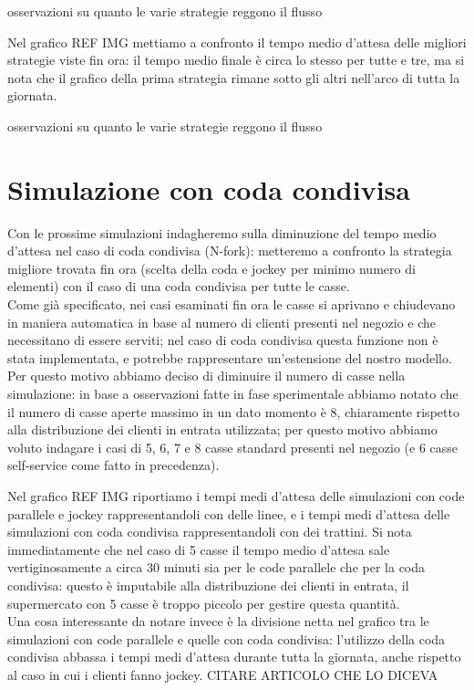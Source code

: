 
osservazioni su quanto le varie strategie reggono il flusso


Nel grafico REF IMG mettiamo a confronto il tempo medio d'attesa delle migliori strategie viste fin ora: il tempo medio finale è circa lo stesso per tutte e tre, ma si nota che il grafico della prima strategia rimane sotto gli altri nell'arco di tutta la giornata.


osservazioni su quanto le varie strategie reggono il flusso

\section{Simulazione con coda condivisa}

Con le prossime simulazioni indagheremo sulla diminuzione del tempo medio d'attesa nel caso di coda condivisa (N-fork): metteremo a confronto la strategia migliore trovata fin ora (scelta della coda e jockey per minimo numero di elementi) con il caso di una coda condivisa per tutte le casse. \\
Come già specificato, nei casi esaminati fin ora le casse si aprivano e chiudevano in maniera automatica in base al numero di clienti presenti nel negozio e che necessitano di essere serviti; nel caso di coda condivisa questa funzione non è stata implementata, e potrebbe rappresentare un'estensione del nostro modello. Per questo motivo abbiamo deciso di diminuire il numero di casse nella simulazione: in base a osservazioni fatte in fase sperimentale abbiamo notato che il numero di casse aperte massimo in un dato momento è 8, chiaramente rispetto alla distribuzione dei clienti in entrata utilizzata; per questo motivo abbiamo voluto indagare i casi di 5, 6, 7 e 8 casse standard presenti nel negozio (e 6 casse self-service come fatto in precedenza).


Nel grafico REF IMG riportiamo i tempi medi d'attesa delle simulazioni con code parallele e jockey rappresentandoli con delle linee, e i tempi medi d'attesa delle simulazioni con coda condivisa rappresentandoli con dei trattini. Si nota immediatamente che nel caso di 5 casse il tempo medio d'attesa sale vertiginosamente a circa 30 minuti sia per le code parallele che per la coda condivisa: questo è imputabile alla distribuzione dei clienti in entrata, il supermercato con 5 casse è troppo piccolo per gestire questa quantità. \\
Una cosa interessante da notare invece è la divisione netta nel grafico tra le simulazioni con code parallele e quelle con coda condivisa: l'utilizzo della coda condivisa abbassa i tempi medi d'attesa durante tutta la giornata, anche rispetto al caso in cui i clienti fanno jockey. CITARE ARTICOLO CHE LO DICEVA

